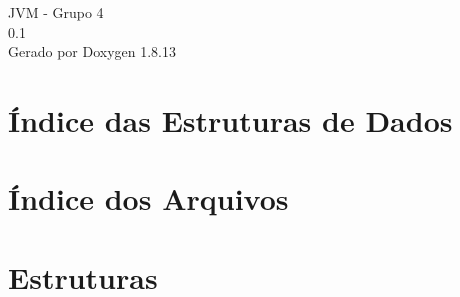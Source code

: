 \documentclass[twoside]{book}
\newcommand{\+}{\discretionary{\mbox{\scriptsize$\hookleftarrow$}}{}{}}
\newcommand{\clearemptydoublepage}{%
  \newpage{\pagestyle{empty}\cleardoublepage}%
}
\begin{document}
\hypersetup{pageanchor=false,
             bookmarksnumbered=true,
             pdfencoding=unicode
            }
\begin{titlepage}
\vspace*{7cm}
\begin{center}%
{\Large J\+VM -\/ Grupo 4 \\[1ex]\large 0.\+1 }\\
\vspace*{1cm}
{\large Gerado por Doxygen 1.8.13}\\
\end{center}
\end{titlepage}
\clearemptydoublepage
{}
\tableofcontents
\clearemptydoublepage
{}
\hypersetup{pageanchor=true}

\chapter{Índice das Estruturas de Dados}

\chapter{Índice dos Arquivos}

\chapter{Estruturas}














































\end{document}
